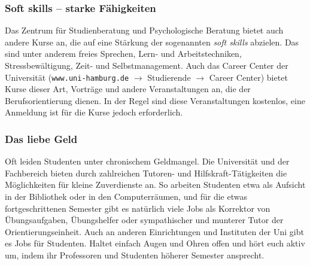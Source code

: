 \subsubsection{Soft skills -- starke Fähigkeiten}

Das Zentrum für Studienberatung und Psychologische Beratung bietet auch andere
Kurse an, die auf eine Stärkung der sogenannten \emph{soft skills} abzielen.
Das sind unter anderem freies Sprechen, Lern- und Arbeitstechniken,
Stressbewältigung, Zeit- und Selbstmanagement. Auch das Career Center der
Universität ({\tt www.uni-hamburg.de} $\rightarrow$ Studierende $\rightarrow$
Career Center) bietet Kurse dieser Art, Vorträge und andere Veranstaltungen an,
die der Berufsorientierung dienen. In der Regel sind diese Veranstaltungen
kostenlos, eine Anmeldung ist für die Kurse jedoch erforderlich.

\subsubsection{Das liebe Geld}

Oft leiden Studenten unter chronischem Geldmangel. Die Universität und der
Fachbereich bieten durch zahlreichen Tutoren- und Hilfskraft-Tätigkeiten die
Möglichkeiten für kleine Zuverdienste an. So arbeiten Studenten etwa als
Aufsicht in der Bibliothek oder in den Computerräumen, und für die etwas
fortgeschrittenen Semester gibt es natürlich viele Jobs als Korrektor von
Übungsaufgaben, Übungshelfer oder sympathischer und munterer Tutor der
Orientierungseinheit. Auch an anderen Einrichtungen und Instituten der Uni gibt
es Jobs für Studenten. Haltet einfach Augen und Ohren offen und hört euch aktiv
um, indem ihr Professoren und Studenten höherer Semester ansprecht.
